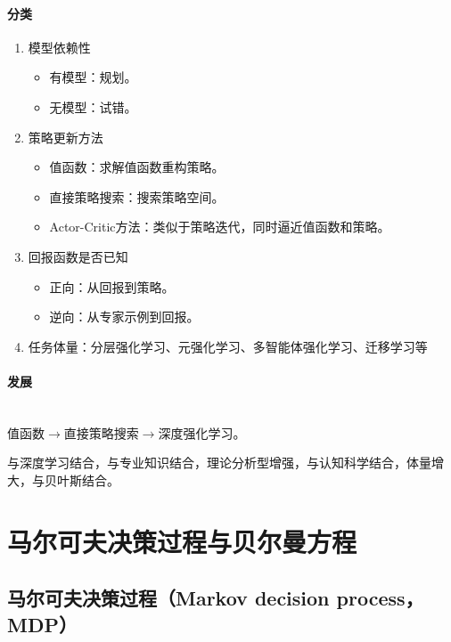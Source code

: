 \documentclass[
12pt, %
a4paper, 
oneside, %
headinclude,footinclude, %
]{scrartcl}
\begin{document}
\paragraph{分类}
\begin{enumerate}
\item 模型依赖性
\begin{itemize}
\item 有模型：规划。
\item 无模型：试错。
\end{itemize}
\item 策略更新方法
\begin{itemize}
\item 值函数：求解值函数重构策略。
\item 直接策略搜索：搜索策略空间。
\item Actor-Critic方法：类似于策略迭代，同时逼近值函数和策略。
\end{itemize}
\item 回报函数是否已知
\begin{itemize}
\item 正向：从回报到策略。
\item 逆向：从专家示例到回报。
\end{itemize}
\item 任务体量：分层强化学习、元强化学习、多智能体强化学习、迁移学习等
\end{enumerate}
\paragraph{发展}~\\

值函数$ \rightarrow $直接策略搜索$ \rightarrow $深度强化学习。

与深度学习结合，与专业知识结合，理论分析型增强，与认知科学结合，体量增大，与贝叶斯结合。
\section{马尔可夫决策过程与贝尔曼方程}
\subsection{马尔可夫决策过程（Markov decision process，MDP）}
\end{document}
